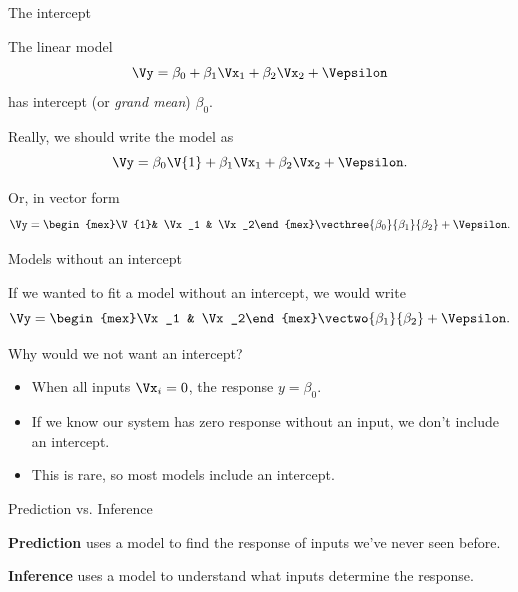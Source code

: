 \documentclass{beamer}
\begin{document}
\newcommand\Vone{\V{1}}

\begin{frame}{The intercept}

The linear model
\[ \Vy = \beta_0 + \beta_1\Vx_1 + \beta_2\Vx_2 + \Vepsilon \]
has intercept (or \emph{grand mean}) $\beta_0$.

\pause
\medskip
Really, we should write the model as
\[ \Vy = \beta_0\Vone + \beta_1\Vx_1 + \beta_2\Vx_2 + \Vepsilon. \]

\pause
Or, in vector form
\[ \Vy = \begin{mex}\Vone & \Vx_1 & \Vx_2\end{mex}\vecthree{\beta_0}{\beta_1}{\beta_2} + \Vepsilon. \]

\end{frame}

\begin{frame}{Models without an intercept}

If we wanted to fit a model without an intercept, we would write 
\[ \Vy = \begin{mex}\Vx_1 & \Vx_2\end{mex}\vectwo{\beta_1}{\beta_2} + \Vepsilon. \]

\pause
Why would we not want an intercept?
\begin{itemize}
	\item When all inputs $\Vx_i = 0$, the response $y = \beta_0$.
	\pause
	\item If we know our system has zero response without an input, we don't include an intercept.
	\pause
	\item This is rare, so most models include an intercept.
\end{itemize}

\end{frame}

\begin{frame}{Prediction vs. Inference}

\textbf{Prediction} uses a model to find the response of inputs we've never seen before.

\medskip
\textbf{Inference} uses a model to understand what inputs determine the response.
	
\end{frame}
\end{document}
